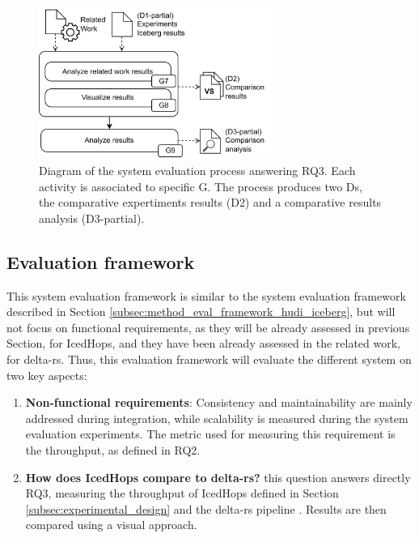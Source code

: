 \begin{figure}[!ht]
    \begin{center}
    \includegraphics[width=0.7\textwidth]{figures/3-method/method_comp.png}
    \caption[System evaluation process - IcedHops vs. delta-rs]{Diagram of the system evaluation process answering \gls{RQ}3. Each activity is associated to specific \gls{G}. The process produces two \glspl{D}, the comparative expertiments results (\gls{D}2) and a comparative results analysis (\gls{D}3-partial).}
    \label{fig:method_comparison}
    \end{center}
\end{figure}



\subsection{Evaluation framework}
\label{subsec:method_eval_framework_iceberg_delta}

This system evaluation framework is similar to the system evaluation framework described in Section \ref{subsec:method_eval_framework_hudi_iceberg}, but will not focus on functional requirements, as they will be already assessed in previous Section, for IcedHops, and they have been already assessed in the related work, for delta-rs. Thus, this evaluation framework will evaluate the different system on two key aspects:
\begin{enumerate}
    \item \textbf{Non-functional requirements}: Consistency and maintainability are mainly addressed during integration, while scalability is measured during the system evaluation experiments. The metric used for measuring this requirement is the throughput, as defined in \gls{RQ}2.
    \item \textbf{How does IcedHops compare to delta-rs?} this question answers directly \gls{RQ}3, measuring the throughput of IcedHops defined in Section \ref{subsec:experimental_design} and the delta-rs pipeline \cite{manfrediReducingReadWrite2024}. Results are then compared using a visual approach.
\end{enumerate}


